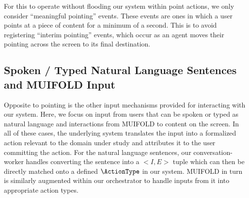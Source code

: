 For this to operate without flooding our system within point actions, we only consider
``meaningful pointing'' events. These events are ones in which a user points at a piece
of content for a minimum of a second. This is to avoid registering ``interim pointing''
events, which occur as an agent moves their pointing across the screen to its final
destination.

\subsection{Spoken / Typed Natural Language Sentences and MUIFOLD Input}

Opposite to pointing is the other input mechanisms provided for interacting with our system.
Here, we focus on input from users that can be spoken or typed as natural language and
interactions from MUIFOLD to content on the screen. In all of these cases, the underlying
system translates the input into a formalized action relevant to the domain under study
and attributes it to the user committing the action. For the natural language sentences,
our conversation-worker handles converting the sentence into a $<I, E>$ tuple which
can then be directly matched onto a defined $\ActionType$ in our system. MUIFOLD in turn is
similarly augmented within our orchestrator to handle inputs from it into appropriate action
types.
